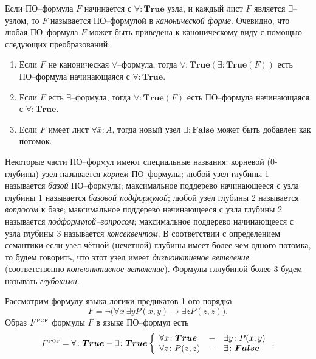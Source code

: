 Если ПО--формула $F$ начинается с $\forall\colon\boldsymbol{True}$ узла, и каждый лист $F$ является $\exists$--узлом, то $F$ называется ПО--формулой в {\em канонической форме}.
Очевидно, что любая ПО--формула $F$ может быть приведена к каноническому виду с помощью следующих преобразований:
\begin{enumerate}
\item Если $F$ не каноническая $\forall$--формула, тогда $\forall\colon \boldsymbol{True}\left(\exists\colon \boldsymbol{True}\left(F\right)\right)$ есть ПО--формула начинающаяся с $\forall\colon\boldsymbol{True}$.
\item Если $F$ есть $\exists$--формула, тогда $\forall\colon \boldsymbol{True}\left(F\right)$ есть ПО--формула начинающаяся с $\forall\colon\boldsymbol{True}$.
\item Если $F$ имеет лист $\forall \bar{x}\colon A$, тогда новый узел $\exists\colon\boldsymbol{False}$ может быть добавлен как потомок.
\end{enumerate}


Некоторые части ПО--формул имеют специальные названия: корневой (0-глубины) узел называется {\em корнем} ПО--формулы; любой узел глубины 1 называется {\em базой} ПО--формулы; максимальное поддерево начинающееся с узла глубины 1 называется {\em базовой подформулой}; любой узел глубины 2 называется {\em вопросом} к базе; максимальное поддерево начинающееся с узла глубины 2 называется {\em подформулой--вопросом}; максимальное поддерево начинающееся с узла глубины 3 называется {\em консеквентом}. В соответствии с определением семантики если узел чётной (нечетной) глубины имеет более чем одного потомка, то будем говорить, что этот узел имеет {\em дизъюнктивное ветвление} (соответственно {\em конъюнктивное ветвление}). Формулы гллубиной более 3 будем называть {\em глубокими}.

\begin{example}
Рассмотрим формулу языка логики предикатов 1-ого порядка
$$F= \neg\bigl(\forall x\:\exists y P(x,y)\rightarrow \exists z P(z,z)\bigr).$$
Образ $F^{\text{\tiny{PCF}}}$ формулы $F$ в языке ПО--формул есть
$$F^{\text{\tiny{PCF}}} = \forall\colon \boldsymbol{True}-\exists\colon\boldsymbol{True} \left\{
\begin{array}{lcl}
 \forall x\colon\boldsymbol{True} & - & \exists y\colon P(x,y) \\
 \forall z\colon P(z,z) & - & \exists\colon\boldsymbol{False}
\end{array}
\right..$$

\end{example}


